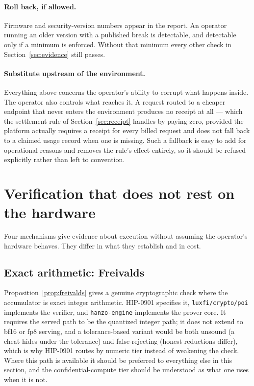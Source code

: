 \documentclass[11pt]{article}
\newcommand{\code}[1]{\texttt{#1}}
\begin{document}
\paragraph{Roll back, if allowed.}
Firmware and security-version numbers appear in the report. An operator running an older version
with a published break is detectable, and detectable only if a minimum is enforced. Without that
minimum every other check in Section~\ref{sec:evidence} still passes.

\paragraph{Substitute upstream of the environment.}
Everything above concerns the operator's ability to corrupt what happens inside. The operator also
controls what reaches it. A request routed to a cheaper endpoint that never enters the environment
produces no receipt at all --- which the settlement rule of Section~\ref{sec:receipt} handles by
paying zero, provided the platform actually requires a receipt for every billed request and does not
fall back to a claimed usage record when one is missing. Such a fallback is easy to add for
operational reasons and removes the rule's effect entirely, so it should be refused explicitly
rather than left to convention.

\section{Verification that does not rest on the hardware}
\label{sec:audit}

Four mechanisms give evidence about execution without assuming the operator's hardware behaves.
They differ in what they establish and in cost.

\subsection{Exact arithmetic: Freivalds}
\label{sec:freivalds}

Proposition~\ref{prop:freivalds} gives a genuine cryptographic check where the accumulator is exact
integer arithmetic. HIP-0901 specifies it, \code{luxfi/crypto/poi} implements the verifier, and
\code{hanzo-engine} implements the prover core. It requires the served path to be the quantized
integer path; it does not extend to bf16 or fp8 serving, and a tolerance-based variant would be both
unsound (a cheat hides under the tolerance) and false-rejecting (honest reductions differ), which is
why HIP-0901 routes by numeric tier instead of weakening the check. Where this path is available it
should be preferred to everything else in this section, and the confidential-compute tier should be
understood as what one uses when it is not.
\end{document}
